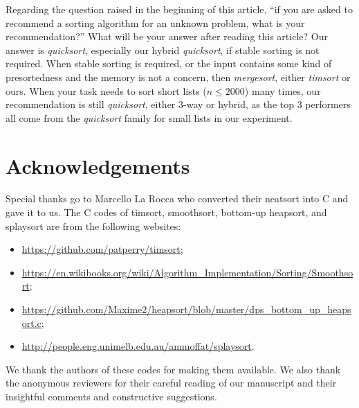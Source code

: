 \documentclass[AMA,STIX1COL]{WileyNJD-v2}
\newcommand{\qusort}{\emph{quicksort }}
\newcommand{\qusortn}{\emph{quicksort}}
\newcommand{\tsort}{\emph{timsort }}
\newcommand{\msortn}{\emph{mergesort}}
\begin{document}
Regarding the question raised in the beginning of this article, “if you are asked to recommend a sorting algorithm for an unknown problem, what is your recommendation?”  What will be your answer after reading this article?  Our answer is \qusortn, especially our hybrid \qusortn, if stable sorting is not required. 
When stable sorting is required, or the input contains some kind of presortedness and the memory is not a concern, then \msortn, either \tsort or ours. 
When your task needs to sort short lists ($n \le 2000$) many times, our recommendation is still \qusortn, either 3-way or hybrid, as the top 3 performers all come from the \qusort family for small lists in our experiment.

\section{Acknowledgements} 
Special thanks go to Marcello La Rocca who converted their neatsort into C and gave it to us. 
The C codes of timsort, smoothsort, bottom-up heapsort, and splaysort are from the following websites: 
\begin{itemize}
\item \url{https://github.com/patperry/timsort};
\item \url{https://en.wikibooks.org/wiki/Algorithm_Implementation/Sorting/Smoothsort};
\item \url{https://github.com/Maxime2/heapsort/blob/master/dps\_bottom\_up\_heapsort.c};
\item \url{http://people.eng.unimelb.edu.au/ammoffat/splaysort}.
\end{itemize}
We thank the authors of these codes for making them available. 
We also thank the anonymous reviewers for their careful reading of our manuscript and their insightful comments and constructive suggestions.



\appendix
\end{document}
